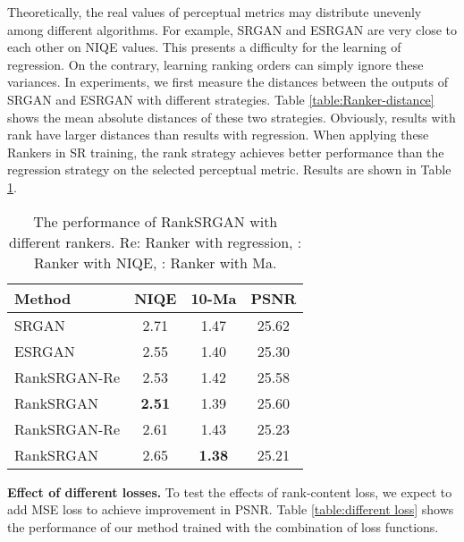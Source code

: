 \documentclass[10pt,twocolumn,letterpaper]{article}
\begin{document}
Theoretically, the real values of perceptual metrics may distribute unevenly among different algorithms. For example, SRGAN and ESRGAN are very close to each other on NIQE values. This presents a difficulty for the learning of regression. On the contrary, learning ranking orders can simply ignore these variances. In experiments, we first measure the distances between the outputs of SRGAN and ESRGAN with different strategies. Table \ref{table:Ranker-distance} shows the mean absolute distances of these two strategies. Obviously, results with rank have larger distances than results with regression. When applying these Rankers in SR training, the rank strategy achieves better performance than the regression strategy on the selected perceptual metric. Results are shown in Table \ref{table:RankSRGAN-regression}.
\vskip -0.1cm
\begin{table}[h]
\small \setlength{\abovecaptionskip}{-0.1cm}
\setlength{\belowcaptionskip}{-0.3cm}
\begin{center}
\begin{tabular}{l|ccc}
\hline\hline
Method&NIQE&10-Ma&PSNR \\
\hline
SRGAN&2.71&1.47&25.62\\
ESRGAN&2.55&1.40&25.30\\
\hline
RankSRGAN-Re&2.53&1.42&25.58\\
RankSRGAN&\textbf{2.51}&1.39&25.60\\
\hline
RankSRGAN-Re&2.61&1.43&25.23\\
RankSRGAN&2.65&\textbf{1.38}&25.21\\
\hline
\end{tabular}
\end{center}
\caption{The performance of RankSRGAN with different rankers. Re: Ranker with regression, : Ranker with NIQE, : Ranker with Ma.}
\label{table:RankSRGAN-regression}
\end{table}

\textbf{Effect of different losses.} To test the effects of rank-content loss, we expect to add MSE loss to achieve improvement in PSNR. Table \ref{table:different loss} shows the performance of our method trained with the combination of loss functions. 
\end{document}
